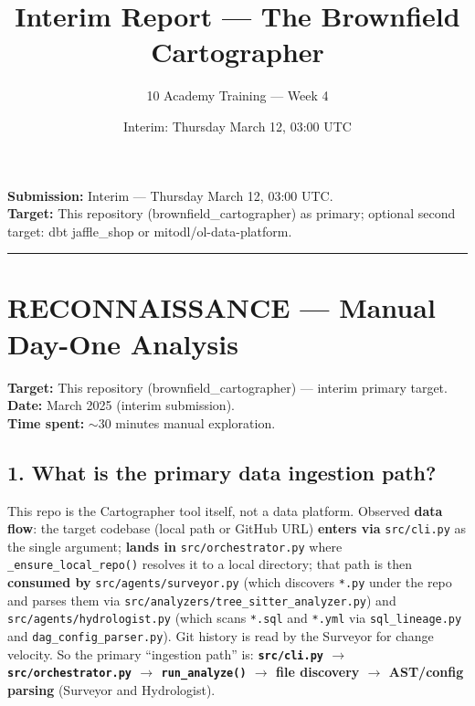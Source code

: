 \documentclass[11pt,a4paper]{article}
\title{\textbf{Interim Report — The Brownfield Cartographer}}
\author{10 Academy Training — Week 4}
\date{Interim: Thursday March 12, 03:00 UTC}
\begin{document}
\maketitle

\textbf{Submission:} Interim — Thursday March 12, 03:00 UTC.\\
\textbf{Target:} This repository (brownfield\_cartographer) as primary; optional second target: dbt jaffle\_shop or mitodl/ol-data-platform.

\vspace{1em}
\hrule
\vspace{1em}

\section{RECONNAISSANCE — Manual Day-One Analysis}

\textbf{Target:} This repository (brownfield\_cartographer) — interim primary target.\\
\textbf{Date:} March 2025 (interim submission).\\
\textbf{Time spent:} $\sim$30 minutes manual exploration.

\subsection{1. What is the primary data ingestion path?}

This repo is the Cartographer tool itself, not a data platform. Observed \textbf{data flow}: the target codebase (local path or GitHub URL) \textbf{enters via} \texttt{src/cli.py} as the single argument; \textbf{lands in} \texttt{src/orchestrator.py} where \texttt{\_ensure\_local\_repo()} resolves it to a local directory; that path is then \textbf{consumed by} \texttt{src/agents/surveyor.py} (which discovers \texttt{*.py} under the repo and parses them via \texttt{src/analyzers/tree\_sitter\_analyzer.py}) and \texttt{src/agents/hydrologist.py} (which scans \texttt{*.sql} and \texttt{*.yml} via \texttt{sql\_lineage.py} and \texttt{dag\_config\_parser.py}). Git history is read by the Surveyor for change velocity. So the primary ``ingestion path'' is: \textbf{\texttt{src/cli.py} $\rightarrow$ \texttt{src/orchestrator.py} $\rightarrow$ \texttt{run\_analyze()} $\rightarrow$ file discovery $\rightarrow$ AST/config parsing} (Surveyor and Hydrologist).
\end{document}
